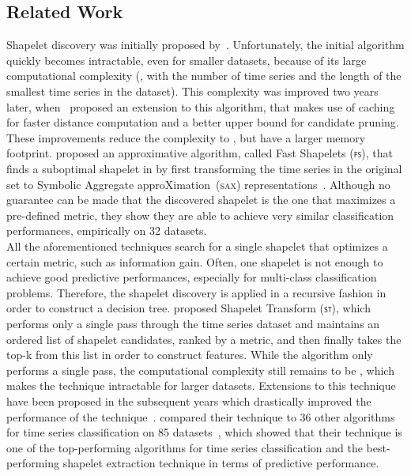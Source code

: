 \documentclass[runningheads]{llncs}
\begin{document}
\subsection{Related Work}\label{sec:related_work}
Shapelet discovery was initially proposed by~\cite{ye2009time}. Unfortunately, the initial algorithm quickly becomes intractable, even for smaller datasets, because of its large computational complexity (, with  the number of time series and  the length of the smallest time series in the dataset). This complexity was improved two years later, when~\cite{mueen2011logical} proposed an extension to this algorithm, that makes use of caching for faster distance computation and a better upper bound for candidate pruning. These improvements reduce the complexity to , but have a larger memory footprint. \cite{rakthanmanon2013fast} proposed an approximative algorithm, called Fast Shapelets (\textsc{\texttt{fs}}), that finds a suboptimal shapelet in  by first transforming the time series in the original set to Symbolic Aggregate approXimation~(\textsc{sax}) representations~\citep{lin2003symbolic}. Although no guarantee can be made that the discovered shapelet is the one that maximizes a pre-defined metric, they show they are able to achieve very similar classification performances, empirically on 32 datasets. \\

All the aforementioned techniques search for a single shapelet that optimizes a certain metric, such as information gain. Often, one shapelet is not enough to achieve good predictive performances, especially for multi-class classification problems. Therefore, the shapelet discovery is applied in a recursive fashion in order to construct a decision tree. \cite{lines2012shapelet} proposed Shapelet Transform (\textsc{\texttt{st}}), which performs only a single pass through the time series dataset and maintains an ordered list of shapelet candidates, ranked by a metric, and then finally takes the top-k from this list in order to construct features. While the algorithm only performs a single pass, the computational complexity still remains to be , which makes the technique intractable for larger datasets. Extensions to this technique have been proposed in the subsequent years which drastically improved the performance of the technique~\citep{hills2014classification,bostrom2017binary}. \cite{lines2012shapelet} compared their technique to 36 other algorithms for time series classification on 85 datasets~\citep{bagnall2016great}, which showed that their technique is one of the top-performing algorithms for time series classification and the best-performing shapelet extraction technique in terms of predictive performance.\\
\end{document}
